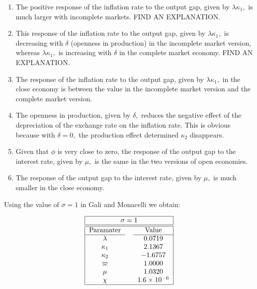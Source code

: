 \documentclass{article}
\begin{document}
\begin{enumerate}
\item The positive response of the inflation rate to the output gap, given
by $\lambda \kappa _{1},$ is much larger with incomplete markets. FIND AN
EXPLANATION.

\item This response of the inflation rate to the output gap, given by $%
\lambda \kappa _{1},$ is decreasing with $\delta $ (openness in production)
in the incomplete market version, whereas $\lambda \kappa _{1},$ is
increasing with $\delta $ in the complete market economy. FIND AN
EXPLANATION.

\item The response of the inflation rate to the output gap, given by $%
\lambda \kappa _{1},$ in the close economy is between the value in the
incomplete market version and the complete market version.

\item The openness in production, given by $\delta ,$ reduces the negative
effect of the depreciation of the exchange rate on the inflation rate. This
is obvious because with $\delta =0,$ the production effect determined $%
\kappa _{2}$ disappears.

\item Given that $\phi $ is very close to zero, the response of the output
gap to the interest rate, given by $\mu ,$ is the same in the two versions
of open economies.

\item The response of the output gap to the interest rate, given by $\mu ,$
is much smaller in the close economy.
\end{enumerate}

Using the value of $\sigma =1$ in Gali and Monacelli we obtain:

\begin{equation*}
\begin{tabular}{|ccc|}
\hline
\multicolumn{3}{|c|}{$\sigma =1$} \\ \hline\hline
Paramater &  & Value \\ \cline{1-1}\cline{3-3}
$\lambda $ &  & $0.0719$ \\ 
$\kappa _{1}$ &  & $2.1367$ \\ 
$\kappa _{2}$ &  & $-1.6757$ \\ 
$\varpi $ &  & $1.0000$ \\ 
$\mu $ &  & $1.0320$ \\ 
$\chi $ &  & $1.6\times 10^{-6}$ \\ \hline
\end{tabular}%
\end{equation*}
\end{document}
